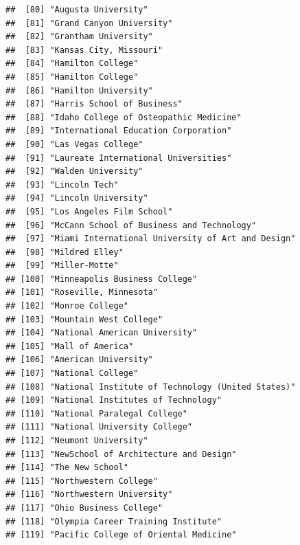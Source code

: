 \documentclass[
]{article}
\begin{document}
\begin{verbatim}
##  [80] "Augusta University"                                    
##  [81] "Grand Canyon University"                               
##  [82] "Grantham University"                                   
##  [83] "Kansas City, Missouri"                                 
##  [84] "Hamilton College"                                      
##  [85] "Hamilton College"                                      
##  [86] "Hamilton University"                                   
##  [87] "Harris School of Business"                             
##  [88] "Idaho College of Osteopathic Medicine"                 
##  [89] "International Education Corporation"                   
##  [90] "Las Vegas College"                                     
##  [91] "Laureate International Universities"                   
##  [92] "Walden University"                                     
##  [93] "Lincoln Tech"                                          
##  [94] "Lincoln University"                                    
##  [95] "Los Angeles Film School"                               
##  [96] "McCann School of Business and Technology"              
##  [97] "Miami International University of Art and Design"      
##  [98] "Mildred Elley"                                         
##  [99] "Miller-Motte"                                          
## [100] "Minneapolis Business College"                          
## [101] "Roseville, Minnesota"                                  
## [102] "Monroe College"                                        
## [103] "Mountain West College"                                 
## [104] "National American University"                          
## [105] "Mall of America"                                       
## [106] "American University"                                   
## [107] "National College"                                      
## [108] "National Institute of Technology (United States)"      
## [109] "National Institutes of Technology"                     
## [110] "National Paralegal College"                            
## [111] "National University College"                           
## [112] "Neumont University"                                    
## [113] "NewSchool of Architecture and Design"                  
## [114] "The New School"                                        
## [115] "Northwestern College"                                  
## [116] "Northwestern University"                               
## [117] "Ohio Business College"                                 
## [118] "Olympia Career Training Institute"                     
## [119] "Pacific College of Oriental Medicine"                  

\end{verbatim}
\end{document}
